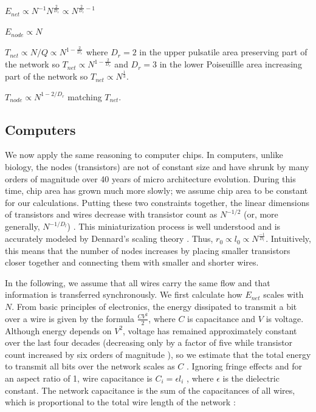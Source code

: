 \documentclass[12pt]{article}
\begin{document}
$E_{net} \propto N^{-1} N^{\frac{2}{D_r}} \propto N^{\frac{2}{D_r} -1} $

$E_{node} \propto N$ %

$T_{net} \propto N/Q \propto N^{1-\frac{2}{D_r}}$ where $D_r = 2$ in the upper
pulsatile area preserving part of the network so $T_{net} \propto
N^{1-\frac{2}{D_r}} $ and $D_r = 3$ in the lower Poiseuillle area increasing
part of the network so $T_{net} \propto N^{\frac{1}{3}}$.

$T_{node} \propto N^{1-2/D_r}$ matching $T_{net}$. 



\subsection{Computers}
\label{sec:computers}

We now apply the same reasoning to computer chips. 
In computers, unlike biology, the nodes (transistors) 
are not of constant size and have shrunk by many orders of magnitude over 40
years of micro architecture evolution.  During this time, chip area has grown
much more slowly; we assume chip area to be constant for our calculations.
Putting these two constraints together, the linear dimensions of transistors
and wires decrease with transistor count as $N^{-1/2}$ (or, more generally,
$N^{-1/D_l}$) \cite{moses08}.  This miniaturization process is well understood
and is accurately modeled by Dennard's scaling theory \cite{dennard74}.  
Thus, $r_0 \propto l_0 \propto N^{\frac{-1}{D_l}}$. Intuitively, this means
that the number of nodes increases by placing smaller transistors closer
together and connecting them with smaller and shorter wires.

In the following, we assume that all wires carry the same flow and that
information is transferred synchronously. We first calculate how $E_{net}$
scales with $N$. From basic principles of electronics, the energy dissipated to
transmit a bit over a wire is given by the formula $\frac{CV^2}{2}$, where $C$ is
capacitance and $V$ is voltage.  Although energy depends on $V^2$, voltage has
remained approximately constant over the last four decades (decreasing only by
a factor of five while transistor count increased by six orders of magnitude
\cite{ning07}), so we estimate that the total energy to transmit all bits over
the network scales as $C$ \cite{bingham08}.  Ignoring fringe effects and for an
aspect ratio of 1, wire capacitance is $C_i = \epsilon l_i$ \cite{wilhelm95},
where $\epsilon$ is the dielectric constant.  The network capacitance is the
sum of the capacitances of all wires, which is proportional to the total wire
length of the network \cite{donath79}:
\end{document}
